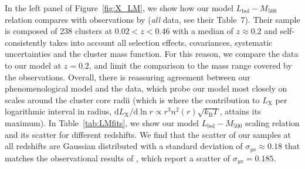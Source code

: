 \documentclass[traditabstract]{aa}
\newcommand{\rmn}{\mathrm}
\newcommand{\dd}{\mathrm{d}}
\begin{document}
In the left panel of Figure~\ref{fig:X_LM}, we show how our model
$L_{\rmn{bol}}-M_{500}$ relation compares with observations by
\cite{2010MNRAS.406.1773M} (\emph{all} data, see their Table~7). Their sample is
composed of 238 clusters at $0.02<z<0.46$ with a median of $z \approx 0.2$ and
self-consistently takes into account all selection effects, covariances,
systematic uncertainties and the cluster mass function. For this reason, we
compare the \cite{2010MNRAS.406.1773M} data to our model at $z=0.2$, and limit
the comparison to the mass range covered by the observations. Overall, there is
reassuring agreement between our phenomenological model and the data, which
probe our model most closely on scales around the cluster core radii (which is
where the contribution to $L_{\rmn{X}}$ per logarithmic interval in radius, $\dd
L_{\rmn{X}}/\dd\ln r \propto r^3 n^2(r) \sqrt{k_{\rmn{B}}T}$, attains its maximum).  In
Table~\ref{tab:LMfits}, we show our model $L_{\rmn{bol}}-M_{500}$ scaling
relation and its scatter for different redshifts. We find that the scatter of
our samples at all redshifts are Gaussian distributed with a standard deviation
of $\sigma_{yx} \approx 0.18$ that matches the observational results of
\cite{2010MNRAS.406.1773M}, which report a scatter of $\sigma_{yx} = 0.185$.
\end{document}

